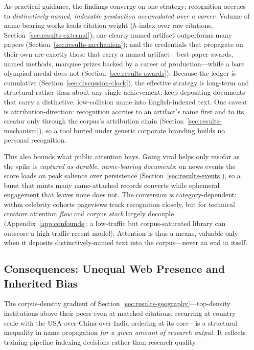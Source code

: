 \documentclass[11pt]{article}
\begin{document}
As practical guidance, the findings converge on one strategy: recognition accrues to \emph{distinctively-named, indexable production accumulated over a career}. Volume of name-bearing works leads citation weight ($h$-index over raw citations, Section~\ref{sec:results-external}); one clearly-named artifact outperforms many papers (Section~\ref{sec:results-mechanism}); and the credentials that propagate on their own are exactly those that carry a named artifact---best-paper awards, named methods, marquee prizes backed by a career of production---while a bare olympiad medal does not (Section~\ref{sec:results-awards}). Because the ledger is cumulative (Section~\ref{sec:discussion-clock}), the effective strategy is long-term and structural rather than about any single achievement: keep depositing documents that carry a distinctive, low-collision name into English-indexed text. One caveat is attribution-direction: recognition accrues to an artifact's name first and to its creator only through the corpus's attribution chain (Section~\ref{sec:results-mechanism}), so a tool buried under generic corporate branding builds no personal recognition.

This also bounds what public attention buys. Going viral helps only insofar as the spike is \emph{captured as durable, name-bearing documents}: on news events the score loads on peak salience over persistence (Section~\ref{sec:results-events}), so a burst that mints many name-attached records converts while ephemeral engagement that leaves none does not. The conversion is category-dependent: within celebrity cohorts pageviews track recognition closely, but for technical creators attention \emph{flow} and corpus \emph{stock} largely decouple (Appendix~\ref{app:confounds}; a low-traffic but corpus-saturated library can outscore a high-traffic recent model). Attention is thus a means, valuable only when it deposits distinctively-named text into the corpus---never an end in itself.

\subsection{Consequences: Unequal Web Presence and Inherited Bias}
\label{sec:discussion-bias}

The corpus-density gradient of Section~\ref{sec:results-geography}---top-density institutions above their peers even at matched citations, recurring at country scale with the USA-over-China-over-India ordering at its core---is a structural inequality in name propagation \emph{for a given amount of research output}. It reflects training-pipeline indexing decisions rather than research quality.
\end{document}
